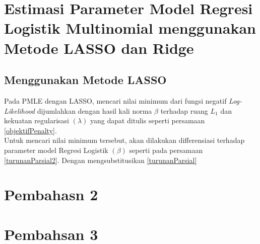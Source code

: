 \section{Estimasi Parameter Model Regresi Logistik Multinomial menggunakan Metode LASSO dan Ridge}
\subsection{Menggunakan Metode LASSO}
Pada PMLE dengan LASSO, mencari nilai minimum dari fungsi negatif \textit{Log-Likelihood} dijumlahkan dengan hasil kali norma $\beta$ terhadap ruang $L_1$ dan kekuatan regularisasi $(\lambda)$ yang dapat ditulis seperti persamaan \ref{objektifPenalty}.\\
Untuk mencari nilai minimum tersebut, akan dilakukan differensiasi terhadap parameter model Regresi Logistik $(\beta)$ seperti pada persamaan \ref{turunanParsial2}. Dengan mengsubstitusikan \ref{turunanParsial} 


\lipsum[2-9]
\section{Pembahasn 2}
\lipsum[10-16]
\section{Pembahsan 3}
\lipsum[17-20]
\cleardoublepage